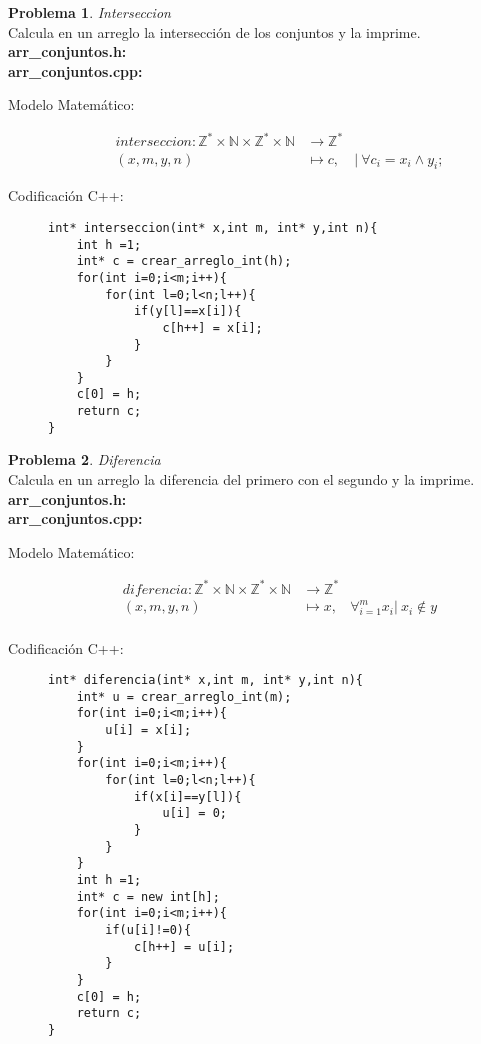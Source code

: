 \documentclass{article}
\theoremstyle{plain}
\theoremstyle{definition}
\newtheorem{problem}{Problema}
\begin{document}
\begin{problem} \emph{Interseccion}\\
Calcula en un arreglo la intersección de los conjuntos y la imprime.\\
\textbf{arr\_conjuntos.h:}\ \\
\textbf{arr\_conjuntos.cpp:}\ 
%
\begin{description}
\item[Modelo Matemático:]
%
\begin{align*}
interseccion: \mathbb{Z}^*\times\mathbb{N}\times\mathbb{Z}^*\times\mathbb{N} &\to \mathbb{Z}^*\\
(x,m,y,n) &\mapsto c,& |\ \forall c_i = x_i \wedge y_i;
\end{align*}
%
\item[Codificación \textsf{C++}:]\hfill
%
\begin{verbatim}
int* interseccion(int* x,int m, int* y,int n){
    int h =1;
    int* c = crear_arreglo_int(h);
    for(int i=0;i<m;i++){
        for(int l=0;l<n;l++){
            if(y[l]==x[i]){
                c[h++] = x[i];
            }
        }
    }
    c[0] = h;
    return c;
}
\end{verbatim}
\end{description}
\end{problem}

\begin{problem} \emph{Diferencia}\\
Calcula en un arreglo la diferencia del primero con el segundo y la imprime.\\
\textbf{arr\_conjuntos.h:}\ \\
\textbf{arr\_conjuntos.cpp:}\ 
%
\begin{description}
\item[Modelo Matemático:]
%
\begin{align*}
diferencia: \mathbb{Z}^*\times\mathbb{N}\times\mathbb{Z}^*\times\mathbb{N} &\to \mathbb{Z}^*\\
(x,m,y,n) &\mapsto x,& \forall_{i=1}^m x_i |\ x_i \not\in y\\
\end{align*}
%
\item[Codificación \textsf{C++}:]\hfill
%
\begin{verbatim}
int* diferencia(int* x,int m, int* y,int n){
    int* u = crear_arreglo_int(m);
    for(int i=0;i<m;i++){
        u[i] = x[i];
    }
    for(int i=0;i<m;i++){
        for(int l=0;l<n;l++){
            if(x[i]==y[l]){
                u[i] = 0;
            }
        }
    }
    int h =1;
    int* c = new int[h];
    for(int i=0;i<m;i++){
        if(u[i]!=0){
            c[h++] = u[i];
        }
    }
    c[0] = h;
    return c;
}
\end{verbatim}
\end{description}
\end{problem}
\end{document}
